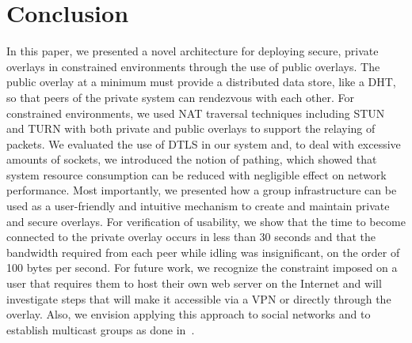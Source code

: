 \documentclass[conference]{IEEEtran}
\begin{document}
\section{Conclusion}
\label{conclusions}
In this paper, we presented a novel architecture for deploying secure, private
overlays in constrained environments through the use of public overlays.
The public overlay at a minimum must provide a distributed data store,
like a DHT, so that peers of the private system can rendezvous with each other.
For constrained environments, we used NAT traversal techniques including STUN and
TURN with both private and public overlays to support the relaying of packets.
We evaluated the use of DTLS in our system and, to deal with excessive amounts of
sockets, we introduced the notion of pathing, which showed that system resource
consumption can be reduced with negligible effect on network performance.  Most
importantly, we presented how a group infrastructure can be used as a user-friendly
and intuitive mechanism to create and maintain private and secure overlays.  
For verification of usability, we show that the time to become connected to the
private overlay occurs in less than 30 seconds and that the bandwidth required 
from each peer while idling was insignificant, on the order of 100 bytes per
second.  For future work, we recognize the constraint imposed on a user that
requires them to host their own web server on the Internet and will investigate
steps that will make it accessible via a VPN or directly through the overlay.
Also, we envision applying this approach to social networks and to establish
multicast groups as done in~\cite{can}.



\suppressfloats
\end{document}
